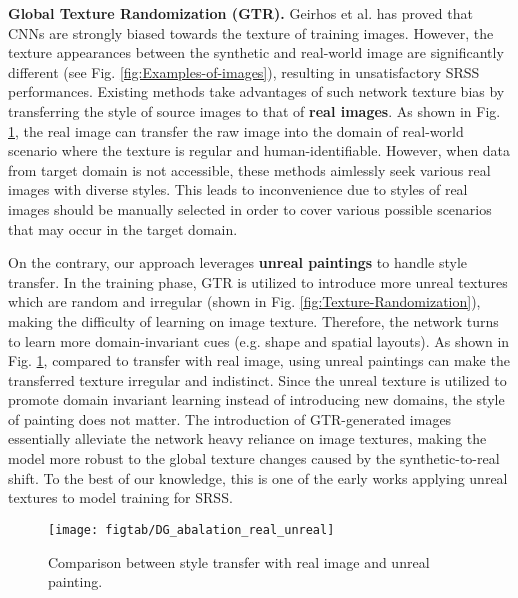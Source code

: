 \documentclass[twocolumn,journal,vlined,ruled,linesnumbered]{IEEEtran}
\begin{document}
\textbf{Global Texture Randomization (GTR).} Geirhos et al. \cite{GeirhosImageNet} has proved that CNNs are strongly biased towards the texture of training images. However, the texture appearances between the synthetic and real-world image are significantly different (see Fig. \ref{fig:Examples-of-images}), resulting in unsatisfactory SRSS performances. Existing methods \cite{bousmalis2017unsupervised,hoffman2017cycada} take advantages of such network texture bias by transferring the style of source images to that of \textbf{real images}. As shown in Fig. \ref{fig:real-unreal-GTR}, the real image can transfer the raw image into the domain of real-world scenario where the texture is regular and human-identifiable. However, when data from target domain is not accessible, these methods aimlessly seek various real images with diverse styles. This leads to inconvenience due to styles of real images should be manually selected in order to cover various possible scenarios that may occur in the target domain.

On the contrary, our approach leverages \textbf{unreal paintings} to handle style transfer. In the training phase, GTR is utilized to introduce more unreal textures which are random and irregular (shown in Fig. \ref{fig:Texture-Randomization}), making the difficulty of learning on image texture. Therefore, the network turns to learn more domain-invariant cues (e.g. shape and spatial layouts). As shown in Fig. \ref{fig:real-unreal-GTR}, compared to transfer with real image, using unreal paintings can make the transferred texture irregular and indistinct. Since the unreal texture is utilized to promote domain invariant learning instead of introducing new domains, the style of painting does not matter. The introduction of GTR-generated images essentially alleviate the network heavy reliance on image textures, making the model more robust to the global texture changes caused by the synthetic-to-real shift. To the best of our knowledge, this is one of the early works applying unreal textures to model training for SRSS.

\begin{figure}[t]
\begin{centering}
\texttt{[image: figtab/DG\_abalation\_real\_unreal]}
\par\end{centering}
\vspace{-2mm}
\caption{Comparison between style transfer with real image and unreal painting.
\label{fig:real-unreal-GTR}}
\vspace{-6mm}
\end{figure}
\end{document}
